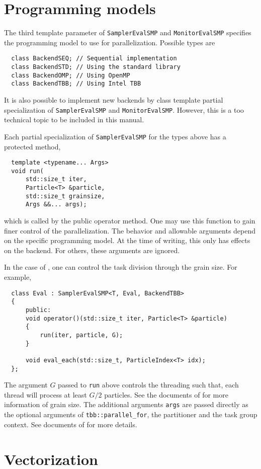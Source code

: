 \section{Programming models}
\label{sec:Programming models}

The third template parameter of \verb|SamplerEvalSMP| and \verb|MonitorEvalSMP|
specifies the programming model to use for parallelization. Possible types are
\begin{Verbatim}
  class BackendSEQ; // Sequential implementation
  class BackendSTD; // Using the standard library
  class BackendOMP; // Using OpenMP
  class BackendTBB; // Using Intel TBB
\end{Verbatim}
It is also possible to implement new backends by class template partial
specialization of \verb|SamplerEvalSMP| and \verb|MonitorEvalSMP|. However,
this is a too technical topic to be included in this manual.

Each partial specialization of \verb|SamplerEvalSMP| for the types above has a
protected method,
\begin{Verbatim}
  template <typename... Args>
  void run(
      std::size_t iter,
      Particle<T> &particle,
      std::size_t grainsize,
      Args &&... args);
\end{Verbatim}
which is called by the public operator method. One may use this function to
gain finer control of the parallelization. The behavior and allowable arguments
depend on the specific programming model. At the time of writing, this only has
effects on the \tbb backend. For others, these arguments are ignored.

In the case of \tbb, one can control the task division through the grain size.
For example,
\begin{Verbatim}
  class Eval : SamplerEvalSMP<T, Eval, BackendTBB>
  {
      public:
      void operator()(std::size_t iter, Particle<T> &particle)
      {
          run(iter, particle, G);
      }

      void eval_each(std::size_t, ParticleIndex<T> idx);
  };
\end{Verbatim}
The argument $G$ passed to \verb|run| above controls the threading such that,
each thread will process at least $G / 2$ particles. See the documents of \tbb
for more information of grain size. The additional arguments \verb|args| are
passed directly as the optional arguments of \verb|tbb::parallel_for|, the
partitioner and the task group context. See documents of \tbb for more details.

\section{Vectorization}
\label{sec:Vectorization}

